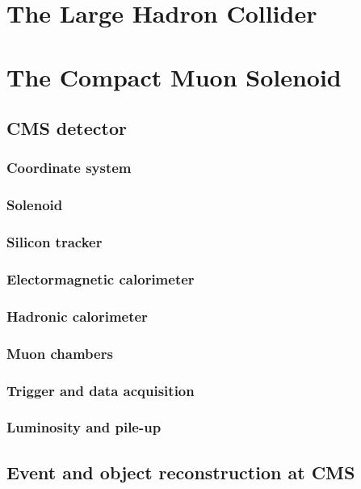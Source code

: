 \clearpage

\setcounter{secnumdepth}{4}
\setcounter{secnumdepth}{4}

\section{The Large Hadron Collider}


\section{The Compact Muon Solenoid}

\subsection{CMS detector}

\subsubsection{Coordinate system}
\subsubsection{Solenoid}
\subsubsection{Silicon tracker}
\subsubsection{Electormagnetic calorimeter}
\subsubsection{Hadronic calorimeter}
\subsubsection{Muon chambers}
\subsubsection{Trigger and data acquisition}
\subsubsection{Luminosity and pile-up}

\subsection{Event and object reconstruction at CMS}


